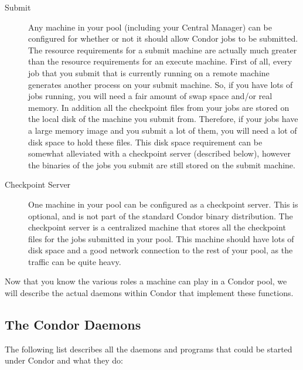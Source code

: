 \begin{description}
\item[Submit] Any machine in your pool (including your Central
Manager) can be configured for whether or not it should allow Condor
jobs to be submitted.  The resource requirements for a submit machine
are actually much greater than the resource requirements for an
execute machine.  First of all, every job that you submit that is
currently running on a remote machine generates another process on
your submit machine.  So, if you have lots of jobs running, you will
need a fair amount of swap space and/or real memory.  In addition all
the checkpoint files from your jobs are stored on the local disk of
the machine you submit from.  Therefore, if your jobs have a large
memory image and you submit a lot of them, you will need a lot of disk
space to hold these files.  This disk space requirement can be
somewhat alleviated with a checkpoint server (described below),
however the binaries of the jobs you submit are still stored on the
submit machine.

\item[Checkpoint Server] One machine in your pool can be configured as
a checkpoint server.  This is optional, and is not part of the
standard Condor binary distribution.  The checkpoint server is a
centralized machine that stores all the checkpoint files for the jobs
submitted in your pool.  This machine should have lots of disk space
and a good network connection to the rest of your pool, as the traffic
can be quite heavy.

\end{description}

Now that you know the various roles a machine can play in a Condor
pool, we will describe the actual daemons within Condor that implement
these functions.

\subsection{The Condor Daemons}
\label{sec:Condor-Daemons}

The following list describes all the daemons and programs that could
be started under Condor and what they do:

